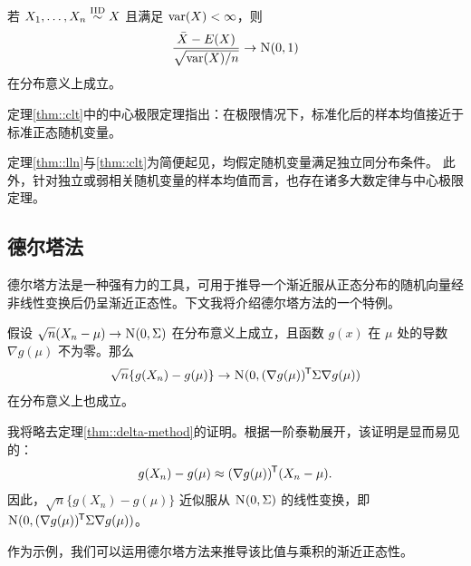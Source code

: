 \begin{theorem}
\label{thm::clt}
若 $X_1,\ldots, X_n \stackrel{\textup{IID}}{\sim} X$ 且满足 $\textup{var} (X) <\infty$，则 
$$ 
\frac{   \bar{X} - E(X)   }
{ \sqrt{ \var (X) /n    } } \rightarrow \N01
$$ 
在分布意义上成立。 
\end{theorem}

定理\ref{thm::clt}中的中心极限定理指出：在极限情况下，标准化后的样本均值接近于标准正态随机变量。 


定理\ref{thm::lln}与\ref{thm::clt}为简便起见，均假定随机变量满足独立同分布条件。  
此外，针对独立或弱相关随机变量\citep[e.g.,][]{durrett2019probability}的样本均值而言，也存在诸多大数定律与中心极限定理。 




\subsection{德尔塔法}\label{section::delta-method}


德尔塔方法是一种强有力的工具，可用于推导一个渐近服从正态分布的随机向量经非线性变换后仍呈渐近正态性。下文我将介绍德尔塔方法的一个特例。


\begin{theorem}
[德尔塔法]\label{thm::delta-method}
假设 $\sqrt{n} (X_n - \mu) \rightarrow \textsc{N}(0, \Sigma)$ 在分布意义上成立，且函数 $g(x)$ 在 $\mu$ 处的导数 $ \nabla g(\mu)   $ 不为零。那么
$$
\sqrt{n} \{  g(X_n) - g(\mu) \}  \rightarrow \textsc{N} (0,   (\nabla g(\mu) ) ^{\mkern-1.5mu\mathsf{T}}  \Sigma \nabla g(\mu)  )
$$
在分布意义上也成立。
\end{theorem}  

我将略去定理\ref{thm::delta-method}的证明。根据一阶泰勒展开，该证明是显而易见的：
$$
g(X_n) - g(\mu) \approx  (\nabla g(\mu) ) ^{\mkern-1.5mu\mathsf{T}}  (X_n - \mu) .
$$
因此，$\sqrt{n} \{  g(X_n) - g(\mu) \} $ 近似服从 $\textsc{N}(0, \Sigma)$ 的线性变换，即 $\textsc{N} (0,   (\nabla g(\mu) ) ^{\mkern-1.5mu\mathsf{T}}  \Sigma \nabla g(\mu)  )$。 




作为示例，我们可以运用德尔塔方法来推导该比值与乘积的渐近正态性。 

